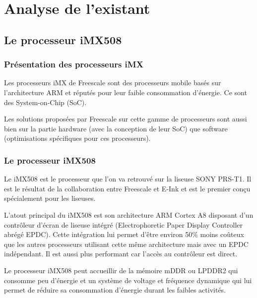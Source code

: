\chapter{Analyse de l'existant}

\section{Le processeur iMX508}

\subsection{Présentation des processeurs iMX}

Les processeurs iMX de Freescale sont des processeurs mobile basés sur l'architecture ARM et réputés pour leur faible consommation d'énergie. Ce sont des System-on-Chip (SoC).


Les solutions proposées par Freescale sur cette gamme de processeurs sont aussi bien sur la partie hardware (avec la conception de leur SoC) que software (optimisations spécifiques pour ces processeurs).

\subsection{Le processeur iMX508}

Le iMX508 est le processeur que l'on va retrouvé sur la liseuse SONY PRS-T1. Il est le résultat de la collaboration entre Freescale et E-Ink et est le premier conçu spécialement pour les liseuses. 

L'atout principal du iMX508 est son architecture ARM Cortex A8 disposant d'un contrôleur d'écran de liseuse intégré (Electrophoretic Paper Display Controller abrégé EPDC). Cette intégration lui permet d'être environ 50\% moins coûteux que les autres processeurs utilisant cette même architecture mais avec un EPDC indépendant. Il est aussi plus performant car l'accès au contrôleur est direct.

Le processeur iMX508 peut accueillir de la mémoire mDDR ou LPDDR2 qui consomme peu d'énergie et un système de voltage et fréquence dynamique qui lui permet de réduire sa consommation d'énergie durant les faibles activités.

